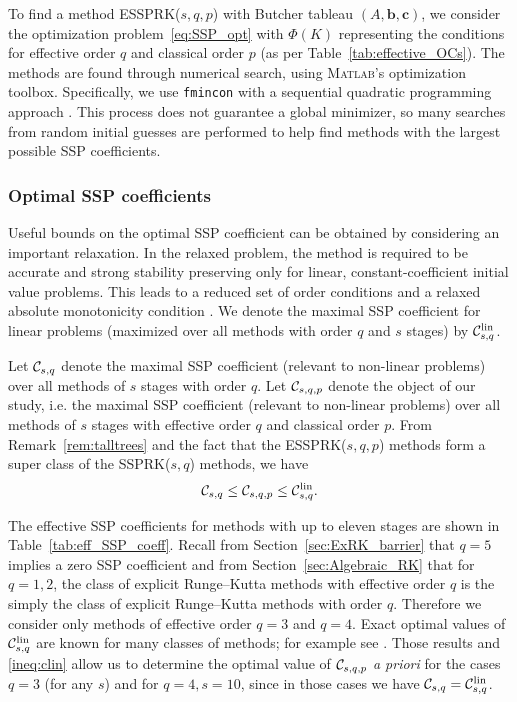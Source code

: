\documentclass{siamltex}  %
\begin{document}
To find a method ESSPRK($s,q,p$) with Butcher tableau $(A, \bm{b},
\bm{c})$, we consider the optimization problem~\eqref{eq:SSP_opt} 
with $\Phi(K)$ representing the conditions for effective order
$q$ and classical order $p$ (as per Table~\ref{tab:effective_OCs}).
The methods are found through numerical search, using 
\textsc{Matlab}'s optimization toolbox.
Specifically, we use \texttt{fmincon} with a sequential quadratic 
programming approach \cite{Ketcheson2008, Ketcheson/Macdonald/Gottlieb:2009}.
This process does not guarantee a global minimizer, so many searches 
from random initial guesses are performed to help
find methods with the largest possible SSP coefficients.

\subsubsection{Optimal SSP coefficients}\label{subsubsec:optimal_SSP_coeff}
Useful bounds on the optimal SSP coefficient can be obtained 
by considering an important relaxation. 
In the relaxed problem, the method is required to be accurate and strong 
stability preserving only for linear, constant-coefficient initial value problems. 
This leads to a reduced set of order conditions and a relaxed absolute 
monotonicity condition \cite{Kraaijevanger1986,Ketcheson2008,ketcheson2009a}.
We denote the maximal SSP coefficient for linear problems
(maximized over all methods with order $q$ and $s$ stages) by $\mathcal{C}^{\textnormal{lin}}_{s,q}$.

Let $\mathcal{C}_{s,q}$ denote the maximal SSP coefficient (relevant to
non-linear problems) over all methods of $s$ stages with order $q$.  Let
$\mathcal{C}_{s,q,p}$ denote the object of our study, i.e. the maximal SSP
coefficient (relevant to non-linear problems) over all methods of $s$ stages
with effective order $q$ and classical order $p$.
From Remark~\ref{rem:talltrees} and the fact that the ESSPRK($s,q,p$) methods
form a super class of the SSPRK($s,q$) methods, we have
\begin{align} \label{ineq:clin}
        \mathcal{C}_{s,q} \le \mathcal{C}_{s,q,p} \le\mathcal{C}^{\textnormal{lin}}_{s,q}.
\end{align}

The effective SSP coefficients for methods with up to eleven stages are shown in 
Table~\ref{tab:eff_SSP_coeff}.
Recall from Section~\ref{sec:ExRK_barrier} that $q=5$ implies a zero
SSP coefficient and from Section~\ref{sec:Algebraic_RK} that for
$q=1,2$, the class of explicit Runge--Kutta methods with effective order $q$
is the simply the class of explicit Runge--Kutta methods with order $q$.  %
Therefore we consider only methods of effective order $q=3$ and $q=4$.
Exact optimal values of $\mathcal{C}^{\textnormal{lin}}_{s,q}$ are known for many classes of methods; for
example see \cite{Kraaijevanger1986,Ketcheson2008,ketcheson2009a}.
Those results and \eqref{ineq:clin} allow us to determine the optimal value
of $\mathcal{C}_{s,q,p}$ {\em a priori} for the cases $q=3$ (for any $s$) and
for $q=4,s=10$, since in those cases we have $\mathcal{C}_{s,q}=\mathcal{C}^{\textnormal{lin}}_{s,q}$.
\end{document}
